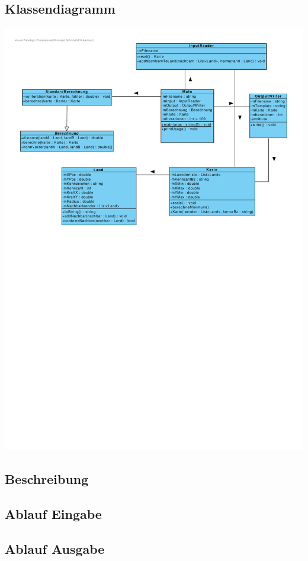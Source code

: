 \documentclass[a4paper,11pt]{article}
\begin{document}
{\subsection{Klassendiagramm}
\includegraphics[width=\linewidth]{klassendiagramm_gropro.pdf}

\subsection{Beschreibung}

\subsection{Ablauf Eingabe}

\subsection{Ablauf Ausgabe}

}
\end{document}
